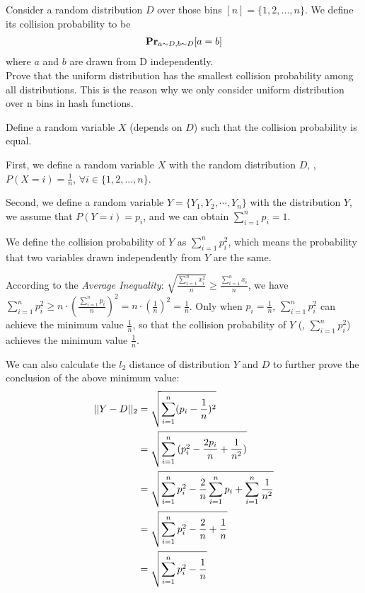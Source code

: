 \begin{problem}[20 points.] Consider a random distribution $D$ over those bins $[n] = \{1, 2, ..., n\}$. We define its collision probability to be
\begin{equation}
\begin{aligned}
\mathbf{Pr}_{a \sim D, b \sim D}{[a = b]} \notag
\end{aligned}
\end{equation}
where $a$ and $b$ are drawn from D independently.  \\
Prove that the uniform distribution has the smallest collision probability among all distributions.
This is the reason why we only consider uniform distribution over n bins in hash functions.

\begin{hint}
Define a random variable $X$ (depends on $D$) such that the collision probability is equal.
\end{hint}

\Answer
First, we define a random variable $X$ with the random distribution $D$, \ie, $P(X = i) = \frac{1}{n}$, $\forall i \in \{1, 2, ..., n\}$. 

Second, we define a random variable $Y = \{Y_1, Y_2, \cdots, Y_n\}$ with the distribution $Y$, we assume that $P(Y = i) = p_i$, and we can obtain $\sum_{i=1}^{n}p_i = 1$.

We define the collision probability of $Y$ as $\sum_{i=1}^{n}p_i^2$, which means the probability that two variables drawn independently from $Y$ are the same.

According to the \textit{Average Inequality}: $\sqrt{\frac{\sum_{i=1}^{n}x_i^2}{n}} \ge \frac{\sum_{i=1}^{n}x_i}{n}$,
we have $\sum_{i=1}^{n}p_i^2 \ge n \cdot (\frac{\sum_{i=1}^{n}p_i}{n})^2 = n \cdot (\frac{1}{n})^2 = \frac{1}{n}$.
Only when $p_i = \frac{1}{n}$, $\sum_{i=1}^{n}p_i^2$ can achieve the minimum value $\frac{1}{n}$,
so that the collision probability of $Y$ (\ie, $\sum_{i=1}^{n}p_i^2$) achieves the minimum value $\frac{1}{n}$.

We can also calculate the $l_2$ distance of distribution $Y$ and $D$ to further prove the conclusion of the above minimum value:
\begin{equation}
\begin{aligned}
||Y - D||_2 &= \sqrt{\sum_{i=1}^{n}(p_i - \frac{1}{n})^2} \notag \\
&= \sqrt{\sum_{i=1}^{n}{(p_i^2 - \frac{2p_i}{n} + \frac{1}{n^2})}} \\
&= \sqrt{\sum_{i=1}^{n}p_i^2 - \frac{2}{n}\sum_{i=1}^{n}p_i + \sum_{i=1}^{n}\frac{1}{n^2}} \\
&= \sqrt{\sum_{i=1}^{n}p_i^2 - \frac{2}{n} + \frac{1}{n}} \\
&= \sqrt{\sum_{i=1}^{n}p_i^2 - \frac{1}{n}} \\
\end{aligned}
\end{equation}


\end{problem}
